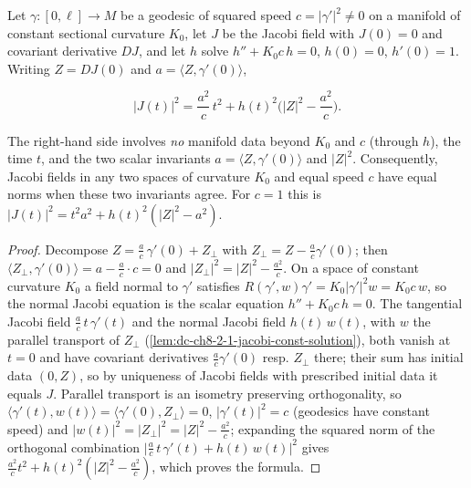 \begin{lemma}
  \label{lem:dc-ch8-2-1-jacobi-norm-transfer}
  \leanok
  Let $\gamma:[0,\ell]\to M$ be a geodesic of squared speed $c=|\gamma'|^2\neq0$ on a
  manifold of constant sectional curvature $K_0$, let $J$ be the Jacobi field with $J(0)=0$
  and covariant derivative $DJ$, and let $h$ solve $h''+K_0c\,h=0$, $h(0)=0$, $h'(0)=1$.
  Writing $Z=DJ(0)$ and $a=\langle Z,\gamma'(0)\rangle$,

  $$
  |J(t)|^2 = \frac{a^2}{c}\,t^2 + h(t)^2\Big(|Z|^2-\frac{a^2}{c}\Big).
  $$

  The right-hand side involves \emph{no} manifold data beyond $K_0$ and $c$ (through $h$),
  the time $t$, and the two scalar invariants $a=\langle Z,\gamma'(0)\rangle$ and $|Z|^2$.
  Consequently, Jacobi fields in any two spaces of curvature $K_0$ and equal speed $c$
  have equal norms when these two invariants agree. For $c=1$ this is
  $|J(t)|^2=t^2a^2+h(t)^2(|Z|^2-a^2)$.
\end{lemma}
\begin{proof}
  \leanok
\sketch
  Decompose $Z=\frac{a}{c}\,\gamma'(0)+Z_\perp$ with $Z_\perp=Z-\frac{a}{c}\gamma'(0)$; then
  $\langle Z_\perp,\gamma'(0)\rangle=a-\frac{a}{c}\cdot c=0$ and
  $|Z_\perp|^2=|Z|^2-\frac{a^2}{c}$. On a space of constant curvature $K_0$ a field normal to
  $\gamma'$ satisfies $R(\gamma',w)\gamma'=K_0|\gamma'|^2w=K_0c\,w$, so the normal Jacobi
  equation is the scalar equation $h''+K_0c\,h=0$. The tangential Jacobi field
  $\frac{a}{c}\,t\,\gamma'(t)$ and the normal Jacobi field
  $h(t)\,w(t)$, with $w$ the parallel transport of $Z_\perp$
  (\cref{lem:dc-ch8-2-1-jacobi-const-solution}), both vanish at $t=0$ and have covariant
  derivatives $\frac{a}{c}\gamma'(0)$ resp. $Z_\perp$ there; their sum has initial data
  $(0,Z)$, so by uniqueness of Jacobi fields with prescribed initial data it equals $J$.
  Parallel transport is an isometry preserving orthogonality, so
  $\langle\gamma'(t),w(t)\rangle=\langle\gamma'(0),Z_\perp\rangle=0$, $|\gamma'(t)|^2=c$
  (geodesics have constant speed) and $|w(t)|^2=|Z_\perp|^2=|Z|^2-\frac{a^2}{c}$; expanding
  the squared norm of the orthogonal combination
  $\big|\frac{a}{c}\,t\,\gamma'(t)+h(t)\,w(t)\big|^2$ gives
  $\frac{a^2}{c}t^2+h(t)^2(|Z|^2-\frac{a^2}{c})$, which proves the formula.
\end{proof}

